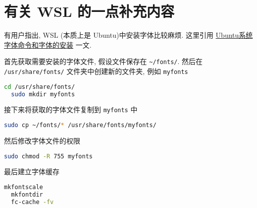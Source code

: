
\chapter{有关 WSL 的一点补充内容}\label{chp:moreonwsl}

有用户指出,
WSL (本质上是 Ubuntu)中安装字体比较麻烦.
这里引用 \href{https://www.jianshu.com/p/e7f12b8c8602}{Ubuntu系统字体命令和字体的安装} 一文.

首先获取需要安装的字体文件,
假设文件保存在 \verb|~/fonts/|.
然后在 \texttt{/usr/share/fonts/} 文件夹中创建新的文件夹,
例如 \texttt{myfonts}
\begin{lstlisting}[language=bash]
  cd /usr/share/fonts/
  sudo mkdir myfonts
\end{lstlisting}
接下来将获取的字体文件复制到 \texttt{myfonts} 中
\begin{lstlisting}[language=bash]
  sudo cp ~/fonts/* /usr/share/fonts/myfonts/ 
\end{lstlisting}
然后修改字体文件的权限
\begin{lstlisting}[language=bash]
  sudo chmod -R 755 myfonts
\end{lstlisting}
最后建立字体缓存
\begin{lstlisting}[language=bash]
  mkfontscale
  mkfontdir
  fc-cache -fv
\end{lstlisting}

